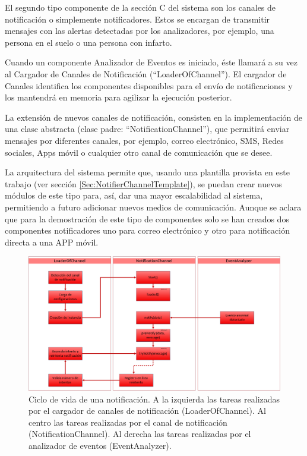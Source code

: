         El segundo tipo componente de la sección C del sistema son los canales de notificación o simplemente notificadores. Estos se encargan de transmitir mensajes con las alertas detectadas por los analizadores, por ejemplo, una persona en el suelo o una persona con infarto.
        
        Cuando un componente Analizador de Eventos es iniciado, éste llamará a su vez al Cargador de Canales de Notificación (``LoaderOfChannel''). El cargador de Canales identifica los componentes disponibles para el envío de notificaciones y los mantendrá en memoria para agilizar la ejecución posterior.
        
        La extensión de nuevos canales de notificación, consisten en la implementación de una clase abstracta (clase padre: ``NotificationChannel''), que permitirá enviar mensajes por diferentes canales, por ejemplo, correo electrónico, SMS, Redes sociales, Apps móvil o cualquier otro canal de comunicación que se desee. 
        
        La arquitectura del sistema permite que, usando una plantilla provista en este trabajo (ver sección \ref{Sec:NotifierChannelTemplate}), se puedan crear nuevos módulos de este tipo para, así, dar una mayor escalabilidad al sistema, permitiendo a futuro adicionar nuevos medios de comunicación. Aunque se aclara que para la demostración de este tipo de componentes solo se han creados dos componentes notificadores uno para correo electrónico y otro para notificación directa a una APP móvil. 
    
        \begin{figure}[ht!]
        	\centering
        	\includegraphics[width=0.9\linewidth]{imgs/03-Architecture/03-NotifyLifeCicle.png}
        	\caption[Ciclo de vida de una notificación]{Ciclo de vida de una notificación. A la izquierda las tareas realizadas por el cargador de canales de notificación (LoaderOfChannel). Al centro las tareas realizadas por el canal de notificación (NotificationChannel). Al derecha las tareas realizadas por el analizador de eventos (EventAnalyzer).}
    	    \label{fig:NotifyLifeCicle}
        \end{figure}%
        
